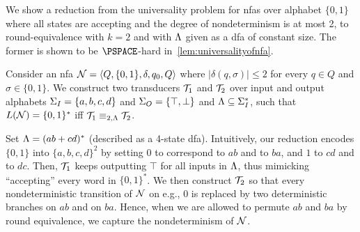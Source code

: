 We show a reduction from the universality problem for \glspl{nfa} over alphabet $\{0,1\}$ where all states are accepting and the degree of nondeterminism is at most 2, to round-equivalence with $k=2$ and with $\Lambda$ given as a \gls{dfa} of constant size. The former is shown to be $\PSPACE$-hard in~\cref{lem:universalityofnfa}.

Consider an \gls{nfa} $\mathcal{N}=\left< Q,\{0,1\},\delta,q_0,Q\right>$ where $|\delta(q,\sigma)|\le 2$ for every $q\in Q$ and $\sigma\in \{0,1\}$.
We construct two transducers $\mathcal{T}_1$ and $\mathcal{T}_2$ over input and output alphabets $\Sigma_{I}=\{a,b,c,d\}$ and $\Sigma_{O}=\{\top,\bot\}$ and $\Lambda\subseteq \Sigma_{I}^*$, such that $L(\mathcal{N})=\{0,1\}^*$ iff $\mathcal{T}_1\equiv_{2,\Lambda}\mathcal{T}_2$. 

Set $\Lambda=(ab+cd)^*$ (described as a 4-state \gls{dfa}). Intuitively, our reduction encodes $\{0,1\}$ into $\{a,b,c,d\}^2$ by setting $0$ to correspond to $ab$ and to $ba$, and $1$ to $cd$ and to $dc$. Then, $\mathcal{T}_1$ keeps outputting $\top$ for all inputs in $\Lambda$, thus mimicking ``accepting'' every word in $\{0,1\}^*$. We then construct $\mathcal{T}_2$ so that every nondeterministic transition of $\mathcal{N}$ on e.g., $0$ is replaced by two deterministic branches on $ab$ and on $ba$. Hence, when we are allowed to permute $ab$ and $ba$ by round equivalence, we capture the nondeterminism of $\mathcal{N}$. 

